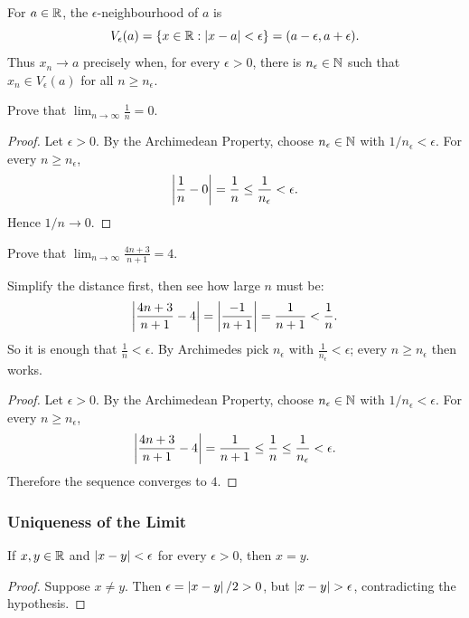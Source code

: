 For $a\in\mathbb{R}$, the $\epsilon$-neighbourhood of $a$ is
\[
    V_\epsilon(a)=\left\{x\in\mathbb{R}:\left|x-a\right|<\epsilon\right\}=(a-\epsilon,a+\epsilon).
\]
Thus $x_n\to a$ precisely when, for every $\epsilon>0$, there is $n_\epsilon\in\mathbb{N}$ such that $x_n\in V_\epsilon(a)$ for all $n\geq n_\epsilon$.

\begin{example}
    Prove that $\lim_{n\to\infty}\frac1n=0$.
\end{example}
\begin{proof}
    Let $\epsilon>0$. By the Archimedean Property, choose $n_\epsilon\in\mathbb{N}$ with $1/n_\epsilon<\epsilon$. For every $n\geq n_\epsilon$,
    \[
        \left|\frac1n-0\right|=\frac1n\leq\frac1{n_\epsilon}<\epsilon.
    \]
    Hence $1/n\to0$.
\end{proof}

\begin{example}
    Prove that $\lim_{n\to\infty}\frac{4n+3}{n+1}=4$.
\end{example}
\begin{scratch}
    Simplify the distance first, then see how large $n$ must be:
    \[
        \left|\frac{4n+3}{n+1}-4\right|=\left|\frac{-1}{n+1}\right|=\frac1{n+1}<\frac1n.
    \]
    So it is enough that $\frac1n<\epsilon$. By Archimedes pick $n_\epsilon$ with $\frac1{n_\epsilon}<\epsilon$; every $n\geq n_\epsilon$ then works.
\end{scratch}
\begin{proof}
    Let $\epsilon>0$. By the Archimedean Property, choose $n_\epsilon\in\mathbb{N}$ with $1/n_\epsilon<\epsilon$. For every $n\geq n_\epsilon$,
    \[
        \left|\frac{4n+3}{n+1}-4\right|
        =\frac1{n+1}\leq\frac1n\leq\frac1{n_\epsilon}<\epsilon.
    \]
    Therefore the sequence converges to $4$.
\end{proof}

\subsubsection{Uniqueness of the Limit}
\begin{proposition}\label{prop:eps-forces-equal}
    If $x,y\in\mathbb{R}$ and $\left|x-y\right|<\epsilon$ for every $\epsilon>0$, then $x=y$.
\end{proposition}
\begin{proof}
    Suppose $x\ne y$. Then $\epsilon=\left|x-y\right|/2>0$, but $\abs{x-y}>\epsilon$, contradicting the hypothesis.
\end{proof}

